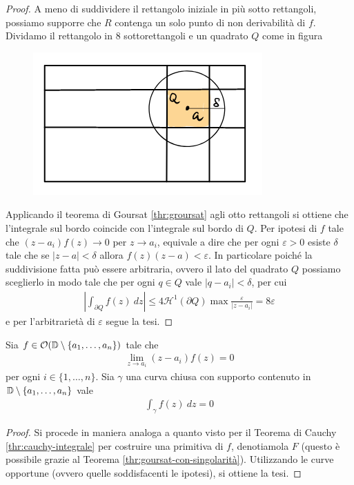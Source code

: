 \begin{proof}
	A meno di suddividere il rettangolo iniziale in più sotto rettangoli, possiamo supporre che $R$ contenga un solo punto di non derivabilità di $f$. Dividamo il rettangolo in $8$ sottorettangoli e un quadrato $Q$ come in figura
	\begin{figure}[h]
		\centering
		\includegraphics[width=0.4\linewidth]{./images/rectangles-singularity-integration.png}
		\caption{}
		\label{fig:rectangles-singularity-integration}
	\end{figure}
	Applicando il teorema di Goursat \ref{thr:groursat} agli otto rettangoli si ottiene che l'integrale sul bordo coincide con l'integrale sul bordo di $Q$. 
	Per ipotesi di $f$ tale che $(z-a_i)f(z) \to 0$ per $z \to a_i$, equivale a dire che per ogni $\varepsilon > 0$ esiste $\delta$ tale che se $|z - a| < \delta$ allora $f(z)(z-a) < \varepsilon$. In particolare poiché la suddivisione fatta può essere arbitraria, ovvero il lato del quadrato $Q$ possiamo sceglierlo in modo tale che per ogni $q\in Q$ vale $|q-a_i| < \delta$, per cui
	\begin{equation*}
	\begin{aligned}
		\left|\int_{\partial Q} f(z)\ dz\right| \le 4 \mathcal{H}^1(\partial Q) \max \frac{\varepsilon }{|z-a_i|} = 8\varepsilon 
	\end{aligned}
	\end{equation*}
	e per l'arbitrarietà di $\varepsilon$ segue la tesi.
\end{proof}

\begin{corollary}
	Sia $f \in \mathcal{O}(\mathbb{D} \setminus \{a_1, \dots, a_n\})$ tale che
	\begin{equation*}
	\begin{aligned}
		\lim_{z\to a_i} (z-a_i)f(z) = 0
	\end{aligned}
	\end{equation*}
	per ogni $i \in \{1, \dots, n\}$. Sia $\gamma$ una curva chiusa con supporto contenuto in $\mathbb{D} \setminus  \{a_1, \dots, a_n\}$ vale
	\begin{equation*}
	\begin{aligned}
		\int_{\gamma} f(z)\ dz = 0
	\end{aligned}
	\end{equation*}
\end{corollary}
\begin{proof}
	Si procede in maniera analoga a quanto visto per il Teorema di Cauchy \ref{thr:cauchy-integrale} per costruire una primitiva di $f$, denotiamola $F$ (questo è possibile grazie al Teorema \ref{thr:goursat-con-singolarità}). Utilizzando le curve opportune (ovvero quelle soddisfacenti le ipotesi), si ottiene la tesi.
\end{proof}

